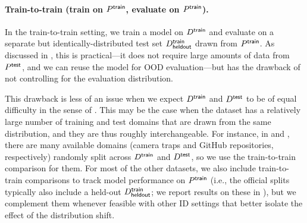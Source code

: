 \paragraph{Train-to-train (train on $P^\mathsf{train}$, evaluate on $P^\mathsf{train}$).}
In the train-to-train setting, we train a model on $D^\mathsf{train}$ and evaluate on a separate but identically-distributed test set $D^\mathsf{train}_\mathsf{heldout}$ drawn from $P^\mathsf{train}$.
As discussed in , this is practical---it does not require large amounts of data from $P^\mathsf{test}$, and we can reuse the model for OOD evaluation---but has the drawback of not controlling for the evaluation distribution.

This drawback is less of an issue when we expect $D^\mathsf{train}$ and $D^\mathsf{test}$ to be of equal difficulty in the sense of .
This may be the case when the dataset has a relatively large number of training and test domains that are drawn from the same distribution, and they are thus roughly interchangeable.
For instance, in \iWildCam and \Py, there are many available domains (camera traps and GitHub repositories, respectively) randomly split across $D^\mathsf{train}$ and $D^\mathsf{test}$, so we use the train-to-train comparison for them.
For most of the other datasets, we also include train-to-train comparisons to track model performance on $P^\mathsf{train}$ (i.e., the official splits typically also include a held-out $D^\mathsf{train}_\mathsf{heldout}$; we report results on these in ), but we complement them whenever feasible with other ID settings that better isolate the effect of the distribution shift.

